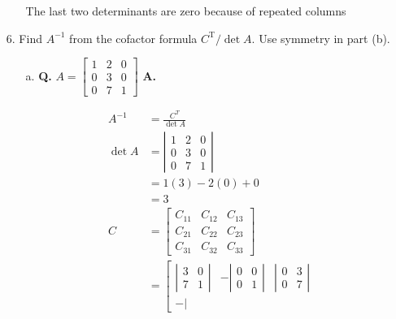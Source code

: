 \documentclass[main.tex]{subfiles}
\begin{document}
\begin{enumerate}
\begin{enumerate}
        The last two determinants are zero because of repeated columns
        
    \end{enumerate}
    
    \item [6.] Find $A^{-1}$ from the cofactor formula $C^{\mathrm{T}} / \operatorname{det} A$. Use symmetry in part (b).
    \begin{enumerate}
        \item [a.] \textbf{Q.} $A=\left[\begin{array}{lll}1 & 2 & 0 \\ 0 & 3 & 0 \\ 0 & 7 & 1\end{array}\right]$ 
        \textbf{A.}
        
        $$
        \begin{aligned}
        A^{-1}&=\frac{C^{T}}{\operatorname{det} A}\\
        \operatorname{det} A &= \left|\begin{array}{lll}
        1 & 2 & 0 \\
        0 & 3 & 0 \\
        0 & 7 & 1
        \end{array}\right| \\
        &=1(3)-2(0)+0 \\
        &=3\\
        C&=\left[\begin{array}{lll}
        C_{11} & C_{12} & C_{13} \\
        C_{21} & C_{22} & C_{23} \\
        C_{31} & C_{32} & C_{33}
        \end{array}\right]\\
        &=\left[\begin{array}{ccc}
        \left|\begin{array}{cc}
        3 & 0 \\
        7 & 1
        \end{array}\right| & -\left|\begin{array}{ccc}
        0 & 0 \\
        0 & 1
        \end{array}\right| & \left|\begin{array}{ll}
        0 & 3 \\
        0 & 7
        \end{array}\right| \\
        -\left|\begin{array}{cc}

\end{array}
\end{array}
\end{aligned}$$
\end{enumerate}
\end{enumerate}
\end{document}
